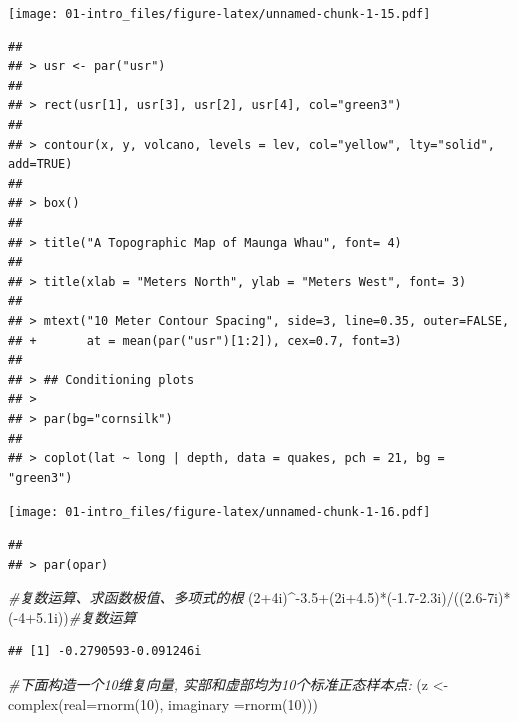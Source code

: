\documentclass[
]{book}
\newenvironment{Shaded}{\begin{snugshade}}{\end{snugshade}}
\newcommand{\AttributeTok}[1]{\textcolor[rgb]{0.77,0.63,0.00}{#1}}
\newcommand{\CommentTok}[1]{\textcolor[rgb]{0.56,0.35,0.01}{\textit{#1}}}
\newcommand{\DecValTok}[1]{\textcolor[rgb]{0.00,0.00,0.81}{#1}}
\newcommand{\FloatTok}[1]{\textcolor[rgb]{0.00,0.00,0.81}{#1}}
\newcommand{\FunctionTok}[1]{\textcolor[rgb]{0.00,0.00,0.00}{#1}}
\newcommand{\NormalTok}[1]{#1}
\newcommand{\OtherTok}[1]{\textcolor[rgb]{0.56,0.35,0.01}{#1}}
\newcommand{\SpecialCharTok}[1]{\textcolor[rgb]{0.00,0.00,0.00}{#1}}
\begin{document}
\texttt{[image: 01-intro\_files/figure-latex/unnamed-chunk-1-15.pdf]}

\begin{verbatim}
## 
## > usr <- par("usr")
## 
## > rect(usr[1], usr[3], usr[2], usr[4], col="green3")
## 
## > contour(x, y, volcano, levels = lev, col="yellow", lty="solid", add=TRUE)
## 
## > box()
## 
## > title("A Topographic Map of Maunga Whau", font= 4)
## 
## > title(xlab = "Meters North", ylab = "Meters West", font= 3)
## 
## > mtext("10 Meter Contour Spacing", side=3, line=0.35, outer=FALSE,
## +       at = mean(par("usr")[1:2]), cex=0.7, font=3)
## 
## > ## Conditioning plots
## > 
## > par(bg="cornsilk")
## 
## > coplot(lat ~ long | depth, data = quakes, pch = 21, bg = "green3")
\end{verbatim}

\texttt{[image: 01-intro\_files/figure-latex/unnamed-chunk-1-16.pdf]}

\begin{verbatim}
## 
## > par(opar)
\end{verbatim}

\begin{Shaded}
\begin{Highlighting}[]
\CommentTok{\#复数运算、求函数极值、多项式的根}
\NormalTok{(}\DecValTok{2}\SpecialCharTok{+}\NormalTok{4i)}\SpecialCharTok{\^{}{-}}\FloatTok{3.5}\SpecialCharTok{+}\NormalTok{(2i}\FloatTok{+4.5}\NormalTok{)}\SpecialCharTok{*}\NormalTok{(}\SpecialCharTok{{-}}\FloatTok{1.7{-}2.3}\NormalTok{i)}\SpecialCharTok{/}\NormalTok{((}\FloatTok{2.6}\SpecialCharTok{{-}}\NormalTok{7i)}\SpecialCharTok{*}\NormalTok{(}\SpecialCharTok{{-}}\DecValTok{4}\FloatTok{+5.1}\NormalTok{i))}\CommentTok{\#复数运算}
\end{Highlighting}
\end{Shaded}

\begin{verbatim}
## [1] -0.2790593-0.091246i
\end{verbatim}

\begin{Shaded}
\begin{Highlighting}[]
\CommentTok{\#下面构造一个10维复向量, 实部和虚部均为10个标准正态样本点:}
\NormalTok{(z }\OtherTok{\textless{}{-}}\FunctionTok{complex}\NormalTok{(}\AttributeTok{real=}\FunctionTok{rnorm}\NormalTok{(}\DecValTok{10}\NormalTok{), }\AttributeTok{imaginary =}\FunctionTok{rnorm}\NormalTok{(}\DecValTok{10}\NormalTok{)))}
\end{Highlighting}
\end{Shaded}
\end{document}
